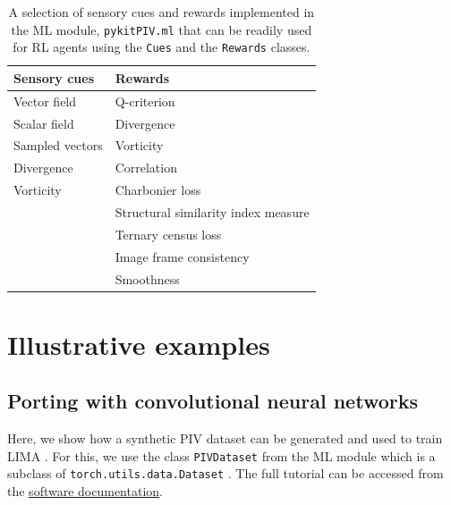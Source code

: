 \documentclass[a4paper,fleqn]{cas-dc}
\begin{document}
\begin{table}[htbp]
  \centering
  \begin{tabular}{ll} 
    \toprule
    \textbf{Sensory cues} & \textbf{Rewards} \\
    \midrule[1.2pt]
    Vector field & Q-criterion \cite{jeong1995identification} \\
    Scalar field & Divergence \\
    Sampled vectors & Vorticity \\
    Divergence & Correlation \cite{lagemann2024challenges} \\
    Vorticity & Charbonier loss \cite{charbonnier1994two} \\
      & Structural similarity index measure \cite{wang2018occlusion} \\
      & Ternary census loss  \cite{zabih1994non} \\
      & Image frame consistency \cite{lagemann2024challenges} \\
      & Smoothness \cite{lagemann2024challenges} \\
    \bottomrule
  \end{tabular}
  \caption{A selection of sensory cues and rewards implemented in the ML module, \texttt{pykitPIV.ml} that can be readily used for RL agents using the \texttt{Cues} and the \texttt{Rewards} classes.}
  \label{tab:rewards-and-cues}
\end{table}

\section{Illustrative examples} \label{sec:examples}

\subsection{Porting with convolutional neural networks} \label{sec:example-CNN}

Here, we show how a synthetic PIV dataset can be generated and used to train LIMA \cite{manickathan2023lightweight}. For this, we use the class \texttt{PIVDataset} from the ML module which is a subclass of \texttt{torch.utils.data.Dataset} \cite{paszke2019pytorch}. The full tutorial can be accessed from the \href{https://pykitpiv.readthedocs.com}{software documentation}.
\end{document}
